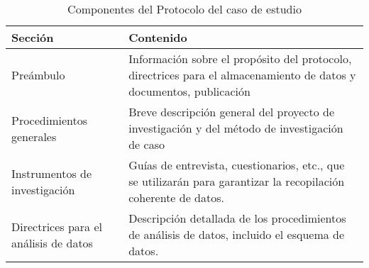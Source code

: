 \begin{table}[h]
\caption{Componentes del Protocolo del caso de estudio}
\begin{tabularx}{\textwidth}{@{}lX@{}}
\toprule
Sección & Contenido \\
\midrule
Preámbulo & Información sobre el propósito del protocolo, directrices para el almacenamiento de datos y documentos, publicación \\
Procedimientos generales & Breve descripción general del proyecto de investigación y del método de investigación de caso \\
Instrumentos de investigación & Guías de entrevista, cuestionarios, etc., que se utilizarán para garantizar la recopilación coherente de datos. \\
Directrices para el análisis de datos & Descripción detallada de los procedimientos de análisis de datos, incluido el esquema de datos. \\
\bottomrule
\end{tabularx}
\end{table}
